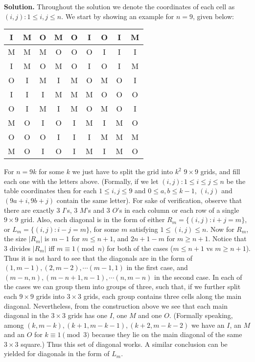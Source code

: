 \documentclass[11pt,a4paper]{article}
\begin{document}
\begin{itemize}
\textbf{Solution.} 
Throughout the solution we denote the coordinates of each cell as $(i, j):1\le i, j\le n$. 
We start by showing an example for $n=9$, given below: 
\begin{center}
\begin{tabular}{|c|c|c||c|c|c||c|c|c|}
\hline
I & M & O & M & O & I & O & I & M\\
\hline
M & M & M & O & O & O & I & I & I\\
\hline
I & M & O & M & O & I & O & I & M\\
\hline
\hline
O & I & M & I & M & O & M & O & I\\
\hline
I & I & I & M & M & M & O & O & O\\
\hline
O & I & M & I & M & O & M & O & I\\
\hline
\hline
M & O & I & O & I & M & I & M & O\\
\hline
O & O & O & I & I & I & M & M & M\\
\hline
M & O & I & O & I & M & I & M & O\\
\hline
\end{tabular}
\end{center}
For $n=9k$ for some $k$ we just have to split the grid into $k^2$ $9\times 9$ grids, and fill each one with the letters above. 
(Formally, if we let $(i, j): 1\le i\le j\le n$ be the table coordinates then for each $1\le i, j\le 9$ and $0\le a, b\le k-1$, 
$(i, j)$ and $(9a+i, 9b+j)$ contain the same letter). 
For sake of verification, observe that there are exactly 3 $I$'s, 3 $M$'s and 3 $O$'s in each column or each row of a single $9\times 9$ grid. 
Also, each diagonal is in the form of either $R_m=\{(i, j): i+j=m\}$, or $L_m=\{(i, j): i-j=m\}$, 
for some $m$ satisfying $1\le (i, j)\le n$. 
Now for $R_m$, the size $|R_m|$ is $m-1$ for $m\le n+1$, and $2n+1-m$ for $m\ge n+1$. 
Notice that 3 divides $|R_m|$ iff $m\equiv 1\pmod{n}$ for both of the cases ($m\le n+1$ vs $m\ge n+1$). 
Thus it is not hard to see that the diagonals are in the form of 
$(1, m-1), (2, m-2), \cdots (m-1, 1)$ in the first case, and 
$(m-n, n), (m-n+1, n-1), \cdots (n, m-n)$ in the second case. 
In each of the cases we can group them into groups of three, such that, if we further split each $9\times 9$ grids into $3\times 3$ grids, each group contains three cells along the main diagonal. 
Nevertheless, from the construction above we see that each main diagonal in the $3\times 3$ grids has one $I$, one $M$ and one $O$. 
(Formally speaking, among $(k, m-k), (k+1, m-k-1), (k+2, m-k-2)$ we have an $I$, an $M$ and an $O$ for $k\equiv 1\pmod{3}$ because they lie on the main diagonal of the same $3\times 3$ square.)
Thus this set of diagonal works. 
A similar conclusion can be yielded for diagonals in the form of $L_m$. 


\end{itemize}
\end{document}
